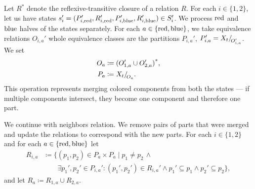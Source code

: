 Let \( R^* \) denote the reflexive-transitive closure of a relation \( R \).
For each \( i \in \{1, 2\} \), let us have states
\( s_i' = (P_{i,\text{red}}', R_{i,\text{red}}', P_{i,\text{blue}}', R_{i,\text{blue}}') \in S_i' \).
%
We process \( \text{red} \) and \( \text{blue} \) halves of the states separately.
For each \( a \in \{\text{red}, \text{blue}\} \),
we take equivalence relations \( O_{i, a}' \)
whole equivalence classes are the partitions \( P_{i, a}' \),
\( P_{i, a}' = X_t{/\!}_{O_{i, a}'}\).
We set
%
\begin{equation}%
	\label{eq:fpt_reflexive_transitive_closure}
	\begin{aligned}
		O_a & \coloneqq {(O_{1, a}' \cup O_{2, a}')}^*, \\
		P_a & \coloneqq \equivclass{X_t}{O_a}.
	\end{aligned}
\end{equation}
%
This operation represents merging colored components from both the states
--- if multiple components intersect, they become one
component and therefore one part.

We continue with neighbors relation. We remove pairs of parts
that were merged and update the relations to correspond with the new parts.
For each \( i \in \{1, 2\} \) and for each \( a \in \{\text{red}, \text{blue}\} \) let
%
\begin{align*}
	R_{i,a} & \coloneqq \{(p_1, p_2) \in P_a \times P_a \mid p_{1} \ne p_{2} \, \land                                                 \\
	        & \qquad \exists p_1', p_2' \in P_{i,a}' : (p_1', p_2') \in R_{i,a}' \land p_1' \subseteq p_1 \land p_2' \subseteq p_2\},
\end{align*}
%
and let \( R_a \coloneqq R_{1,a} \cup R_{2,a} \).

